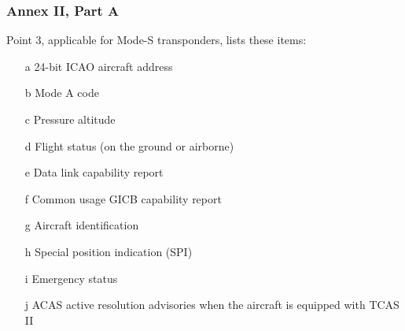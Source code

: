 \documentclass[a4paper]{article}
\begin{document}
\subsubsection{{Annex II, Part A}}
Point 3, applicable for Mode-S transponders, lists these items:
\begin{itemize}
\item[a]{24-bit ICAO aircraft address}
\item[b]{Mode A code}
\item[c]{Pressure altitude}
\item[d]{Flight status (on the ground or airborne)}
\item[e]{Data link capability report}
\item[f]{Common usage {GICB} capability report}
\item[g]{Aircraft identification}
\item[h]{Special position indication (SPI)}
\item[i]{Emergency status}
\item[j]{{ACAS} active resolution advisories when the aircraft is equipped with TCAS II}
\end{itemize}
\end{document}
